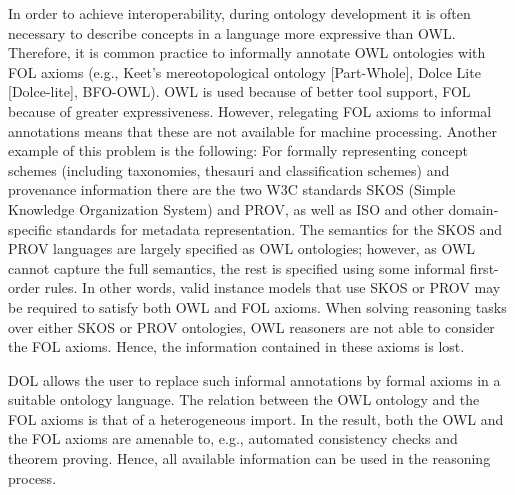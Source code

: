 \documentclass[10pt,%
\ifpretendfinal
final%
\else
draft%
\fi,
]{scrreprt}
\begin{document}
In order to achieve interoperability, during ontology development it is often necessary to describe 
concepts in a language more expressive than OWL.  Therefore, it is common practice to informally 
annotate OWL ontologies with FOL axioms (e.g., Keet's mereotopological ontology [Part-Whole], 
Dolce Lite [Dolce-lite], BFO-OWL). OWL is used because of better tool support, FOL because of 
greater expressiveness. However, relegating FOL axioms to  informal annotations means that these 
are not available for machine processing.  Another example of this problem is the following: For 
formally representing concept schemes (including taxonomies, thesauri and classification schemes) 
and provenance information there are the two W3C standards SKOS (Simple Knowledge Organization 
System) and PROV, as well as ISO and other domain-specific  standards for 
metadata representation. The semantics for the SKOS and PROV languages are largely specified as OWL 
ontologies; however, as OWL cannot capture the full semantics, the rest is specified using some 
informal first-order rules. In other words, valid instance models that use SKOS or PROV may be 
required to satisfy both OWL and FOL axioms. When solving reasoning tasks over either SKOS or PROV 
ontologies, OWL reasoners are not able to consider the  FOL axioms. Hence, the information 
contained in these axioms is lost.

DOL allows the user to replace such informal annotations by formal axioms in a suitable ontology 
language. The relation between the OWL ontology and the FOL axioms is that of a heterogeneous 
import. In the result, both the OWL and the FOL axioms are amenable to, e.g., automated consistency 
checks and theorem proving. Hence, all available information can be used in the reasoning process.
\end{document}
